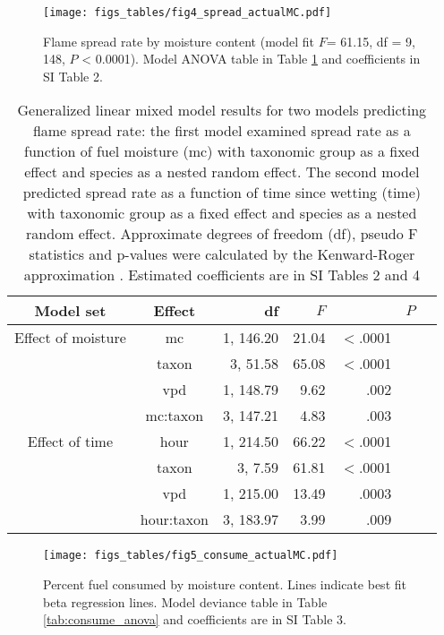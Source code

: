 \documentclass[letterpaper,12pt]{article}
\begin{document}
\begin{figure}[h]
  \centering
\texttt{[image: figs\_tables/fig4\_spread\_actualMC.pdf]}
\caption{Flame spread rate by moisture content (model fit $F$= 61.15, df = 9,
  148, $P$ < 0.0001). Model ANOVA table in Table \ref{tab:spreadrate_anova} and
  coefficients in SI Table 2.}
  \label{fig:spread_moist}
\end{figure}

\begin{table}[h]
  \caption{Generalized linear mixed model results for two models predicting
    flame spread rate: the first model examined spread rate as a function of
    fuel moisture (mc) with taxonomic group as a fixed effect and species as a
    nested random effect. The second model predicted spread rate as a function
    of time since wetting (time) with taxonomic group as a fixed effect and
    species as a nested random effect. Approximate degrees of freedom (df),
    pseudo F statistics and p-values were calculated by the Kenward-Roger
    approximation \citep{Kenward_Roger-1997}. Estimated coefficients are in SI
    Tables 2 and 4}
  \label{tab:spreadrate_anova}
\centering
\begin{tabular}{ccrrrrr}
  \toprule
Model set & Effect & df & $F$ & & $P$ \\
  \midrule
  Effect of moisture & mc & 1, 146.20 & 21.04 & $<$.0001 \\ 
 &  taxon & 3, 51.58 & 65.08 & $<$.0001 \\ 
 & vpd & 1, 148.79 & 9.62 & .002 \\ 
 & mc:taxon & 3, 147.21 & 4.83 & .003 \\ 
   
  \midrule
  
  Effect of time & hour & 1, 214.50 & 66.22 & $<$.0001 \\ 
 &  taxon & 3, 7.59 & 61.81 & $<$.0001 \\ 
 & vpd & 1, 215.00 & 13.49 & .0003 \\ 
 & hour:taxon & 3, 183.97 & 3.99 & .009 \\ 

   \bottomrule

\end{tabular}
\end{table}

\begin{figure}[h]
  \centering
\texttt{[image: figs\_tables/fig5\_consume\_actualMC.pdf]}
\caption{Percent fuel consumed by moisture content. Lines indicate best fit
  beta regression lines. Model deviance table in Table \ref{tab:consume_anova}
  and coefficients are in SI Table 3.}
  \label{fig:consume_moist}
\end{figure}
\end{document}
